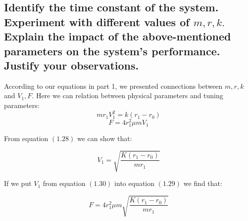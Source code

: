 \documentclass[11pt]{scrartcl} %
\begin{document}
\subsection{Identify the time constant of the system. Experiment with different values of $m, r, k .$ Explain the impact of the above-mentioned parameters on the system's performance. Justify your observations.}
According to our equations in part 1, we presented connections between $m, r, k$ and $V_1, F$. Here we can relation between physical parameters and tuning parameters:
\begin{equation}m r_{1} V_{1}^{2}=k\left(r_{1}-r_{0}\right)\end{equation}
\begin{equation}
F=4 r_{1}^{2} \mu m V_{1}
\end{equation}

From equation $(1.28)$ we can show that:

\begin{equation}
V_1 = \sqrt{\frac{K(r_1 - r_0)}{mr_1}}
\end{equation}

If we put $V_1$ from equation $(1.30)$ into equation $(1.29)$ we find that:

\begin{equation}
F = 4r_1^2\mu m\sqrt{\frac{K(r_1 - r_0)}{mr_1}}
\end{equation}
\end{document}
